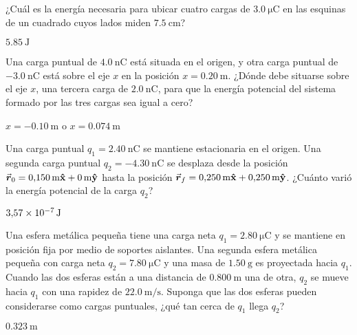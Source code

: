 \setcounter{figure}{0}
%
\begin{Exercise}
  ¿Cuál es la energía necesaria para ubicar cuatro cargas de $\SI{3.0}{\micro\coulomb}$ en las esquinas de un cuadrado cuyos lados miden $\SI{7.5}{\centi\metre}$?
\end{Exercise}
\begin{Answer}
  $\SI{5.85}{\joule}$
\end{Answer}
%
\begin{Exercise}
  Una carga puntual de $\SI{4.0}{\nano\coulomb}$ está situada en el origen, y otra carga puntual de $\SI{-3.0}{\nano\coulomb}$ está sobre el eje $x$ en la posición $x = \SI{0.20}{\metre}$. ¿Dónde debe situarse sobre el eje $x$, una tercera carga de $\SI{2.0}{\nano\coulomb}$, para que la energía potencial del sistema formado por las tres cargas sea igual a cero?
\end{Exercise}
\begin{Answer}
	\begin{minipage}[t]{.4\textwidth}
    $x = \SI{-0.10}{\metre}$ o $x = \SI{0.074}{\metre}$
  \end{minipage}
\end{Answer}
%
\begin{Exercise}
  Una carga puntual $q_1 = \SI{2.40}{\nano\coulomb}$ se mantiene estacionaria en el origen. Una segunda carga puntual $q_2 = \SI{-4.30}{\nano\coulomb}$ se desplaza desde la posición $\va*{r}_0 =\SI{0.150}{\metre}\vu{x} + \SI{0}{\metre}\vu{y}$ hasta la posición $\va*{r}_f =\SI{0.250}{\metre}\vu{x} + \SI{0.250}{\metre}\vu{y}$. ¿Cuánto varió la energía potencial de la carga $q_2$?
\end{Exercise}
\begin{Answer}
  $\SI{3.57E-7}{\joule}$
\end{Answer}
%
\begin{Exercise}
  Una esfera metálica pequeña tiene una carga neta $q_1 = \SI{2.80}{\micro\coulomb}$ y se mantiene en posición fija por medio de soportes aislantes. Una segunda esfera metálica pequeña con carga neta $q_2 = \SI{7.80}{\micro\coulomb}$ y una masa de $\SI{1.50}{\gram}$ es proyectada hacia $q_1$. Cuando las dos esferas están a una distancia de $\SI{0.800}{\metre}$ una de otra, $q_2$ se mueve hacia $q_1$ con una rapidez de $\SI{22.0}{\metre/\second}$. Suponga que las dos esferas pueden considerarse como cargas puntuales, ¿qué tan cerca de $q_1$ llega $q_2$?
\end{Exercise}
\begin{Answer}
  $\SI{0.323}{\metre}$
\end{Answer}
